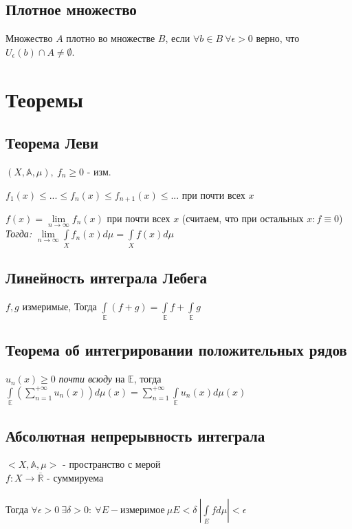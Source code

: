 \documentclass[paper=a4, fontsize=14pt]{report}
\begin{document}
\section{Плотное множество}
Множество $A$ плотно во множестве $B$, если $\forall b \in B \ \forall \epsilon > 0$ верно, что $U_\epsilon(b) \cap A \neq \emptyset$.

\chapter{Теоремы}

\section{Теорема Леви}
$(X,\mathds{A},\mu),\ f_n \geqslant 0$ - изм.

$f_1(x) \leqslant ...\leqslant f_n(x) \leqslant f_{n+1}(x) \leqslant ...$ при почти всех $x$

$f(x) = \lim\limits_{n \rightarrow \infty}f_n(x)$ при почти всех $x$ (считаем, что при остальных $x: f \equiv 0$)
\\

\emph{Тогда:} $\lim\limits_{n \rightarrow \infty} \int\limits_{X}f_n(x)d\mu = \int\limits_{X}f(x)d\mu$

\section{Линейность интеграла Лебега}
$f, g $ измеримые, 
Тогда $\int\limits_{\mathds{E}} (f + g) = \int\limits_{\mathds{E}} f + \int\limits_{\mathds{E}} g$

\section{Теорема об интегрировании положительных рядов}
$u_n(x) \geq 0$ \textit{почти всюду} на $\mathds{E}$, тогда
$\int\limits_{\mathds{E}} (\sum\limits_{n=1}^{+\infty}u_n(x))d\mu(x) =
\sum\limits_{n=1}^{+\infty} \int\limits_{\mathds{E}} u_n(x)d\mu(x)$

\section{Абсолютная непрерывность интеграла}
$<X, \mathds{A}, \mu>$ - пространство с мерой\\
$f : X \to \overline{\mathds{R}}$ - суммируема\\\\
Тогда $\forall \epsilon > 0 ~ \exists \delta > 0 : ~ \forall E - \text{измеримое} ~ \mu E < \delta ~ |\int\limits_{E}f d\mu| < \epsilon$
\end{document}
